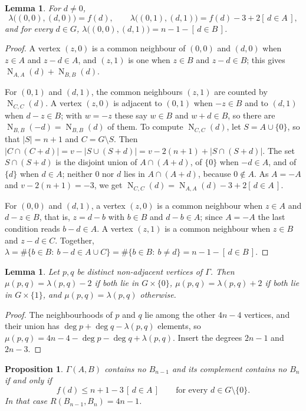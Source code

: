 \documentclass[11pt]{amsart}
\newtheorem{proposition}[theorem]{Proposition}
\newtheorem{lemma}[theorem]{Lemma}
\theoremstyle{definition}
\theoremstyle{remark}
\numberwithin{equation}{section}
\newcommand{\NN}{\operatorname{N}}
\newcommand{\ind}[1]{[\,#1\,]}
\begin{document}
\begin{lemma}\label{lem:lambda}
For $d\ne0$,
\[
\lambda\big((0,0),(d,0)\big)=f(d),\qquad \lambda\big((0,1),(d,1)\big)=f(d)-3+2\ind{d\in A},
\]
and for every $d\in G$, $\lambda\big((0,0),(d,1)\big)=n-1-\ind{d\in B}$.
\end{lemma}

\begin{proof}
A vertex $(z,0)$ is a common neighbour of $(0,0)$ and $(d,0)$ when $z\in A$ and $z-d\in A$, and $(z,1)$ is one when $z\in B$ and $z-d\in B$; this gives $\NN_{A,A}(d)+\NN_{B,B}(d)$.

For $(0,1)$ and $(d,1)$, the common neighbours $(z,1)$ are counted by $\NN_{C,C}(d)$. A vertex $(z,0)$ is adjacent to $(0,1)$ when $-z\in B$ and to $(d,1)$ when $d-z\in B$; with $w=-z$ these say $w\in B$ and $w+d\in B$, so there are $\NN_{B,B}(-d)=\NN_{B,B}(d)$ of them. To compute $\NN_{C,C}(d)$, let $S=A\cup\{0\}$, so that $|S|=n+1$ and $C=G\setminus S$. Then $|C\cap(C+d)|=v-|S\cup(S+d)|=v-2(n+1)+|S\cap(S+d)|$. The set $S\cap(S+d)$ is the disjoint union of $A\cap(A+d)$, of $\{0\}$ when $-d\in A$, and of $\{d\}$ when $d\in A$; neither $0$ nor $d$ lies in $A\cap(A+d)$, because $0\notin A$. As $A=-A$ and $v-2(n+1)=-3$, we get $\NN_{C,C}(d)=\NN_{A,A}(d)-3+2\ind{d\in A}$.

For $(0,0)$ and $(d,1)$, a vertex $(z,0)$ is a common neighbour when $z\in A$ and $d-z\in B$, that is, $z=d-b$ with $b\in B$ and $d-b\in A$; since $A=-A$ the last condition reads $b-d\in A$. A vertex $(z,1)$ is a common neighbour when $z\in B$ and $z-d\in C$. Together, $\lambda=\#\{b\in B:\ b-d\in A\cup C\}=\#\{b\in B:\ b\ne d\}=n-1-\ind{d\in B}$.
\end{proof}

\begin{lemma}\label{lem:mu}
Let $p,q$ be distinct non-adjacent vertices of $\Gamma$. Then $\mu(p,q)=\lambda(p,q)-2$ if both lie in $G\times\{0\}$, $\mu(p,q)=\lambda(p,q)+2$ if both lie in $G\times\{1\}$, and $\mu(p,q)=\lambda(p,q)$ otherwise.
\end{lemma}

\begin{proof}
The neighbourhoods of $p$ and $q$ lie among the other $4n-4$ vertices, and their union has $\deg p+\deg q-\lambda(p,q)$ elements, so $\mu(p,q)=4n-4-\deg p-\deg q+\lambda(p,q)$. Insert the degrees $2n-1$ and $2n-3$.
\end{proof}

\begin{proposition}\label{prop:star}
$\Gamma(A,B)$ contains no $B_{n-1}$ and its complement contains no $B_n$ if and only if
\begin{equation}\label{eq:star}
f(d)\le n+1-3\,\ind{d\in A}\qquad\text{for every } d\in G\setminus\{0\}.
\end{equation}
In that case $R(B_{n-1},B_n)=4n-1$.
\end{proposition}
\end{document}
